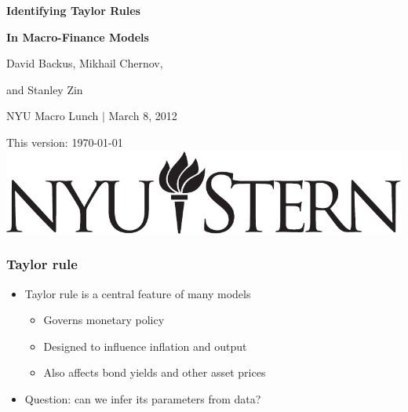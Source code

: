 \documentclass{beamer}
\title[Identifying Taylor Rules]{}
\author[Backus, Chernov, \& Zin]{}
\institute[NYU, LSE]{}
\date[]{\today}
\begin{document}
\vspace*{0.65in}
\centerline{\Large\bf Identifying Taylor Rules}
\vspace*{0.05in}
\centerline{\Large\bf In Macro-Finance Models}

\bigskip\bigskip\bigskip\medskip
\centerline{David Backus, Mikhail Chernov,}
\centerline{and Stanley Zin}

\bigskip\medskip\medskip\medskip
\centerline{NYU Macro Lunch $|$ March 8, 2012}

\vfill
{\tiny \hspace{7pt}This version: \today}
{\hfill \includegraphics[scale=0.25]{stern_logo3.pdf}}

\begin{frame}
\frametitle{Taylor rule}
\begin{itemize} \itemsep=\bigskipamount
\item Taylor rule is a central feature of many models
\begin{itemize}
\item Governs monetary policy
\item Designed to influence inflation and output
\item Also affects bond yields and other asset prices
\end{itemize}
\item Question:  can we infer its parameters from data?
\end{itemize}
\end{frame}
\end{document}

